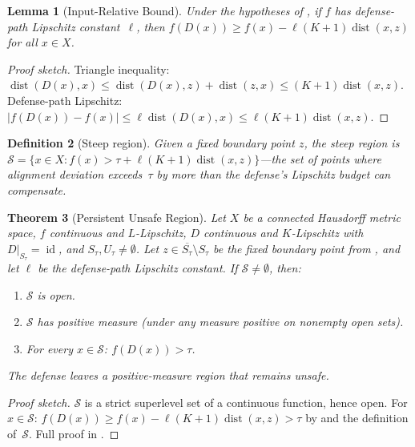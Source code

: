 \documentclass[11pt]{article}
\newtheorem{theorem}{Theorem}[section]
\newtheorem{lemma}[theorem]{Lemma}
\newtheorem{definition}[theorem]{Definition}
\newcommand{\cl}[1]{\overline{#1}}
\newcommand{\id}{\operatorname{id}}
\newcommand{\dist}{\operatorname{dist}}
\begin{document}
\begin{lemma}[Input-Relative Bound]
\label{lem:input-bound}
Under the hypotheses of , if $f$ has
defense-path Lipschitz constant~$\ell$, then
$f(D(x)) \geq f(x) - \ell(K+1)\dist(x,z)$
for all $x \in X$.
\end{lemma}

\begin{proof}[Proof sketch]
Triangle inequality:
$\dist(D(x), x) \leq \dist(D(x), z) + \dist(z, x)
\leq (K+1)\dist(x, z)$.
Defense-path Lipschitz: $|f(D(x)) - f(x)| \leq \ell\dist(D(x), x)
\leq \ell(K+1)\dist(x, z)$.
\end{proof}

\begin{definition}[Steep region]
\label{def:steep}
Given a fixed boundary point $z$, the \emph{steep region} is
$\mathcal{S} = \{x \in X : f(x) > \tau + \ell(K+1)\dist(x, z)\}$---the
set of points where alignment deviation exceeds~$\tau$ by more than
the defense's Lipschitz budget can compensate.
\end{definition}

\begin{theorem}[Persistent Unsafe Region]
\label{thm:persistent}
Let $X$ be a connected Hausdorff metric space, $f$ continuous and
$L$-Lipschitz, $D$ continuous and $K$-Lipschitz with
$D|_{S_\tau} = \id$, and $S_\tau, U_\tau \neq \emptyset$.
Let $z \in \cl{S_\tau} \setminus S_\tau$ be the fixed boundary
point from , and let $\ell$ be the defense-path
Lipschitz constant. If $\mathcal{S} \neq \emptyset$, then:
\begin{enumerate}[nosep]
  \item $\mathcal{S}$ is open.
  \item $\mathcal{S}$ has positive measure (under any measure positive
    on nonempty open sets).
  \item For every $x \in \mathcal{S}$: $f(D(x)) > \tau$.
\end{enumerate}
The defense leaves a positive-measure region that remains unsafe.
\end{theorem}

\begin{proof}[Proof sketch]
$\mathcal{S}$ is a strict superlevel set of a continuous function,
hence open. For $x \in \mathcal{S}$:
$f(D(x)) \geq f(x) - \ell(K+1)\dist(x,z) > \tau$
by  and the definition of~$\mathcal{S}$.
Full proof in .
\end{proof}
\end{document}
